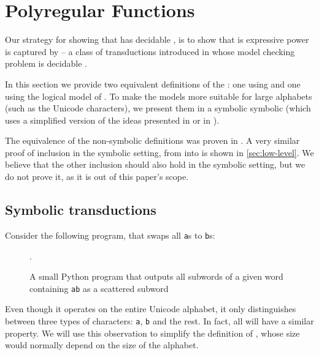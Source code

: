 \newpage
\section{Polyregular Functions}
\label{sec:polyregular}

Our strategy for showing that  has decidable ,
is to show that is expressive power is captured by  -- 
a class of transductions introduced in \cite{bojanczyk2018polyregular} whose model checking 
problem is decidable \cite[Theorem~1.7]{bojanczyk2018polyregular}. 

In this section we provide two equivalent definitions of the : 
one using  \cite[p. 19]{bojanczyk2018polyregular} and
one using the logical model of  \cite[Definition 4]{bojanczyk2019string}.
To make the models more suitable for large alphabets (such as the Unicode characters), we present them 
in a symbolic symbolic (which uses a simplified version of the ideas presented in \cite{d2017power} or 
in \cite[Section~3.1]{bojanczyk2023growth}).

The equivalence of the non-symbolic definitions was proven 
in \cite{bojanczyk2018polyregular}. A very similar proof of inclusion in the symbolic setting, from 
 into 
is shown in \cref{sec:low-level}. We believe that the other inclusion should also hold in the symbolic setting,
but we do not prove it, as it is out of this paper's scope.

\subsection{Symbolic transductions}
Consider the following program, that swaps all \texttt{a}s to \texttt{b}s:\\
\begin{figure}[h]
    \centering
    
    \caption{A small Python program that
        outputs all subwords of a given word containing \texttt{ab}
        as a scattered subword}.
    \label{fig:python-example-nested}
\end{figure}
Even though it operates on the entire Unicode alphabet, it only distinguishes between three types of characters:
\texttt{a}, \texttt{b} and the rest. In fact, all  will have a similar property. 
We will use this observation to simplify the definition of
, whose size would normally depend on the size of the alphabet.

